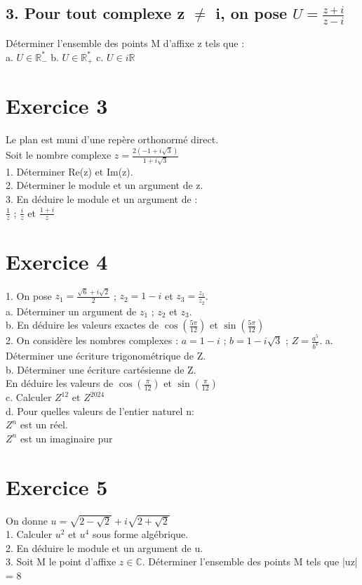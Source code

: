 \documentclass[12pt]{article}
\begin{document}
\subsection*{3. Pour tout complexe z $\neq$ i, on pose \(U = \frac{z + i}{z - i}\)}
Déterminer l’ensemble des points M d'affixe z tels que :\\
a. \(U \in \mathbb{R}^{*}_{-}\)\quad
b. \(U \in \mathbb{R}^{*}_{+}\)\quad
c. \(U \in i\mathbb{R}\)\quad

\section*{Exercice 3}
Le plan est muni d'une repère orthonormé direct.\\
Soit le nombre complexe	$z=\frac{2(-1 + i\sqrt{3})}{1 + i\sqrt{3}}$\\
1. Déterminer Re(z) et Im(z).\\
2. Déterminer le module et un argument de z.\\
3. En déduire le module et un argument de :\\
$\frac{1}{z}$ ; $\frac{i}{z}$ et $\frac{1+i}{z}$

\section*{Exercice 4}
1. On pose $z_{1}=\frac{\sqrt{6}+i\sqrt{2}}{2}$ ; $z_{2}=1-i$ et $z_{3}=\frac{z_{1}}{z_{2}}$.\\
	a. Déterminer un argument de $z_{1}$ ; $z_{2}$ et $z_{3}$.\\
	b. En déduire les valeurs exactes de $\cos(\frac{5\pi}{12})$ et $\sin(\frac{5\pi}{12})$\\
2. On considère les nombres complexes : $a = 1-i$ ; $b=1-i\sqrt{3}$ ; $Z=\frac{a^{5}}{b^{4}}$.
	a. Déterminer une écriture trigonométrique de Z.\\
	b. Déterminer une écriture cartésienne de Z.\\
	En déduire les valeurs de $\cos(\frac{\pi}{12})$ et $\sin(\frac{\pi}{12})$\\
	c. Calculer $Z^{12}$ et $Z^{2024}$\\
	d. Pour quelles valeurs de l’entier naturel n:\\
	$Z^{n}$ est un réel.\\
	$Z^{n}$ est un imaginaire pur

\section*{Exercice 5}
On donne $u=\sqrt{2-\sqrt{2}}+i \sqrt{2+\sqrt{2}}$\\
1. Calculer $u^{2}$ et $u^{4}$ sous forme algébrique.\\
2. En déduire le module et un argument de u.\\
3. Soit M le point d’affixe $z \in \mathbb{C}$.
Déterminer l’ensemble des points M tels que |uz| = 8
\end{document}
